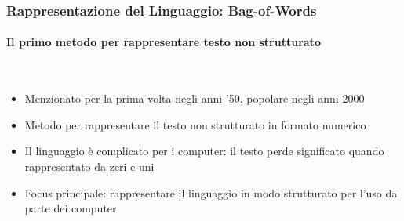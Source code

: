 \begin{frame}[t,fragile] \frametitle{Rappresentazione del Linguaggio: Bag-of-Words}
	{\scriptsize
		\onslide<1->
            \framesubtitle{Il primo metodo per rappresentare testo non strutturato}
            \vspace*{-15pt}
            \begin{minipage}[t]{\textwidth}
            \end{minipage}
            \\\vspace*{3pt}
	    	\begin{minipage}[t]{\textwidth}
				\begin{minipage}[t]{0.6\textwidth}
	    			\begin{itemize}[leftmargin=10pt,align=right]
						\onslide<2->\item[\alert{\faHandORight}] \alert{Menzionato per la prima volta} negli anni '50, popolare negli anni 2000
						\onslide<3->\item[\alert{\faHandORight}] Metodo per rappresentare il testo \alert{non strutturato} in formato numerico
						\onslide<4->\item[\alert{\faHandORight}] Il \alert{linguaggio è complicato} per i computer: il testo perde significato quando rappresentato da zeri e uni
						\onslide<5->\item[\alert{\faHandORight}] Focus principale: rappresentare il linguaggio in \alert{modo strutturato} per l'uso da parte dei computer
					\end{itemize}
            	\end{minipage}
            	\begin{minipage}[t]{0.4\textwidth}
            	\end{minipage}
	    	\end{minipage}
	}
\end{frame}
